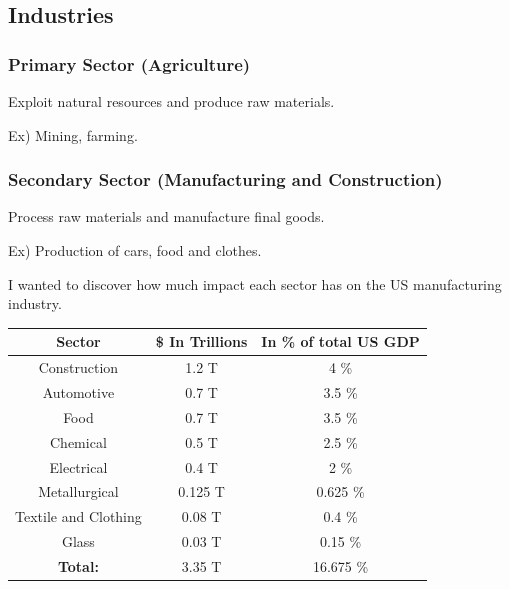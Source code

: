 \documentclass{article}
\newcounter{subsubsubsection}[subsubsection]
\begin{document}
\newpage









\subsection{Industries}

\newpage









\subsubsection{Primary Sector (Agriculture)}

Exploit natural resources and produce raw materials. 

Ex) Mining, farming. 

\newpage






\subsubsection{Secondary Sector (Manufacturing and Construction)}

Process raw materials and manufacture final goods.

Ex) Production of cars, food and clothes. 

\newpage






I wanted to discover how much impact each sector has on the US manufacturing industry.

\begin{center}
 \begin{tabular}{||c c c||} 
 \hline
 \textbf{Sector} & \textbf{\$ In Trillions} & \textbf{In \% of total US GDP} \\ [0.5ex] 
 \hline\hline
 Construction & 1.2 T & 4 \% \\ [1ex] 
 \hline
 Automotive & 0.7 T & 3.5 \% \\ [1ex] 
 \hline
 Food & 0.7 T & 3.5 \% \\ [1ex] 
 \hline
 Chemical & 0.5 T & 2.5 \% \\ [1ex] 
 \hline
 Electrical & 0.4 T & 2 \% \\ [1ex] 
 \hline
 Metallurgical & 0.125 T & 0.625 \% \\ [1ex] 
 \hline
 Textile and Clothing & 0.08 T & 0.4 \% \\ [1ex] 
 \hline
 Glass & 0.03 T & 0.15 \% \\ [1ex] 
 \hline
 \hline
  \textbf{Total:} & 3.35 T & 16.675 \% \\ [1ex] 
 \hline 
\end{tabular}
\end{center}
\end{document}
